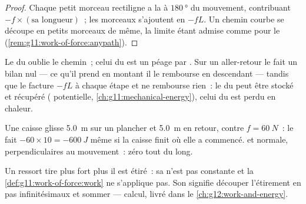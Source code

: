 \begin{proof}
Chaque petit morceau rectiligne a la
 à $\qty{180}{\degree}$ du mouvement,
contribuant $-f \times (\text{sa longueur})$~; les morceaux s'ajoutent
en $-fL$. Un chemin courbe se découpe en petits morceaux de même, la
limite étant admise comme pour le
(\cref{rem:g11:work-of-force:anypath}).
\end{proof}

\begin{remark}\label{rem:g11:work-of-force:divide}
Le  du
 oublie le chemin~; celui du
 est un péage par
. Sur un aller-retour le
 fait un bilan nul --- ce qu'il
prend en montant il le rembourse en descendant --- tandis que le
 facture $-fL$ à chaque étape et
ne rembourse rien~: le  du
 peut être stocké et récupéré
( potentielle, \cref{ch:g11:mechanical-energy}), celui du
 est perdu en chaleur.
\end{remark}

\begin{example}\label{ex:g11:work-of-force:roundtrip}
Une caisse glisse \qty{5.0}{m} sur un plancher et \qty{5.0}{m} en
retour, contre $f = \qty{60}{N}$~: le
 fait $-60 \times 10 =
\qty{-600}{J}$ même si la caisse finit où elle a commencé.
 et
 normale, perpendiculaires au
mouvement~: zéro tout du long.
\end{example}

\begin{remark}[Et un ressort~?]\label{rem:g11:work-of-force:spring}
Un ressort tire plus fort plus il est étiré~: sa
 n'est pas constante et la
\cref{def:g11:work-of-force:work} ne s'applique pas. Son
 signifie découper l'étirement en
pas infinitésimaux et sommer --- calcul, livré dans le
\cref{ch:g12:work-and-energy}.
\end{remark}

